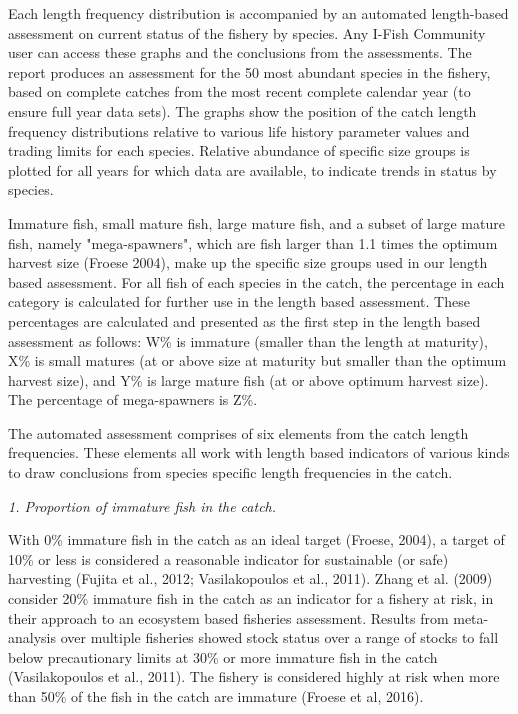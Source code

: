 Each length frequency distribution is accompanied by an automated length-based assessment on current status of the fishery by species. Any I-Fish Community user can access these graphs and the conclusions from the assessments. The report produces an assessment for the 50 most abundant species in the fishery, based on complete catches from the most recent complete calendar year (to ensure full year data sets). The graphs show the position of the catch length frequency distributions relative to various life history parameter values and trading limits for each species. Relative abundance of specific size groups is plotted for all years for which data are available, to indicate trends in status by species.

Immature fish, small mature fish, large mature fish, and a subset of large mature fish, namely "mega-spawners", which are fish larger than 1.1 times the optimum harvest size (Froese 2004), make up the specific size groups used in our length based assessment. For all fish of each species in the catch, the percentage in each category is calculated for further use in the length based assessment. These percentages are calculated and presented as the first step in the length based assessment as follows: W\% is immature (smaller than the length at maturity), X\% is small matures (at or above size at maturity but smaller than the optimum harvest size), and Y\% is large mature fish (at or above optimum harvest size). The percentage of mega-spawners is Z\%.

The automated assessment comprises of six elements from the catch length frequencies. These elements all work with length based indicators of various kinds to draw conclusions from species specific length frequencies in the catch.

\textit{1. Proportion of immature fish in the catch.}

With 0\% immature fish in the catch as an ideal target (Froese, 2004), a target of 10\% or less is considered a reasonable indicator for sustainable (or safe) harvesting (Fujita et al., 2012; Vasilakopoulos et al., 2011). Zhang et al. (2009) consider 20\% immature fish in the catch as an indicator for a fishery at risk, in their approach to an ecosystem based fisheries assessment. Results from meta-analysis over multiple fisheries showed stock status over a range of stocks to fall below precautionary limits at 30\% or more immature fish in the catch (Vasilakopoulos et al., 2011). The fishery is considered highly at risk when more than 50\% of the fish in the catch are immature (Froese et al, 2016).


